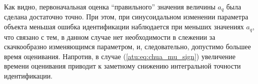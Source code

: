 Как видно, первоначальная оценка ``правильного'' значения величины $a_q$
была сделана достаточно точно. При этом, при синусоидальном изменении параметра объекта
меньшая ошибка идентификации наблюдается при меньших значениях $a_q$, что связано
с тем, в данном случае нет необходимости в слежении за скачкообразно изменяющимся параметром,
и, следовательно, допустимо большее время оценивания. Напротив, в случае (\ref{atu:eq:chua_mu_sign})
увеличение времени оценивания приводит к заметному снижению интегральной точности идентификации.


